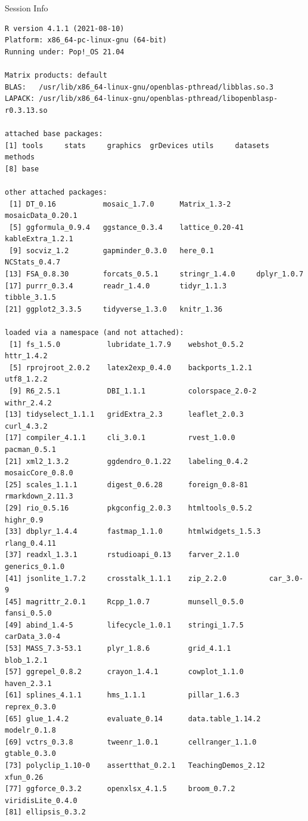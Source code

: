 \documentclass[10pt,handout]{beamer}\usepackage[]{graphicx}\usepackage[]{color}
\makeatletter
\newenvironment{kframe}{%
 \def\at@end@of@kframe{}%
 \ifinner\ifhmode%
  \def\at@end@of@kframe{\end{minipage}}%
  \begin{minipage}{\columnwidth}%
 \fi\fi%
 \def\FrameCommand##1{\hskip\@totalleftmargin \hskip-\fboxsep
 \colorbox{shadecolor}{##1}\hskip-\fboxsep
     \hskip-\linewidth \hskip-\@totalleftmargin \hskip\columnwidth}%
 \MakeFramed {\advance\hsize-\width
   \@totalleftmargin\z@ \linewidth\hsize
   \@setminipage}}%
 {\par\unskip\endMakeFramed%
 \at@end@of@kframe}
\newenvironment{knitrout}{}{} %
\makeatother
\begin{document}
\begin{frame}[fragile]{Session Info}
	\tiny
	
\begin{knitrout}\tiny
{}\color{fgcolor}\begin{kframe}
\begin{verbatim}
R version 4.1.1 (2021-08-10)
Platform: x86_64-pc-linux-gnu (64-bit)
Running under: Pop!_OS 21.04

Matrix products: default
BLAS:   /usr/lib/x86_64-linux-gnu/openblas-pthread/libblas.so.3
LAPACK: /usr/lib/x86_64-linux-gnu/openblas-pthread/libopenblasp-r0.3.13.so

attached base packages:
[1] tools     stats     graphics  grDevices utils     datasets  methods  
[8] base     

other attached packages:
 [1] DT_0.16           mosaic_1.7.0      Matrix_1.3-2      mosaicData_0.20.1
 [5] ggformula_0.9.4   ggstance_0.3.4    lattice_0.20-41   kableExtra_1.2.1 
 [9] socviz_1.2        gapminder_0.3.0   here_0.1          NCStats_0.4.7    
[13] FSA_0.8.30        forcats_0.5.1     stringr_1.4.0     dplyr_1.0.7      
[17] purrr_0.3.4       readr_1.4.0       tidyr_1.1.3       tibble_3.1.5     
[21] ggplot2_3.3.5     tidyverse_1.3.0   knitr_1.36       

loaded via a namespace (and not attached):
 [1] fs_1.5.0           lubridate_1.7.9    webshot_0.5.2      httr_1.4.2        
 [5] rprojroot_2.0.2    latex2exp_0.4.0    backports_1.2.1    utf8_1.2.2        
 [9] R6_2.5.1           DBI_1.1.1          colorspace_2.0-2   withr_2.4.2       
[13] tidyselect_1.1.1   gridExtra_2.3      leaflet_2.0.3      curl_4.3.2        
[17] compiler_4.1.1     cli_3.0.1          rvest_1.0.0        pacman_0.5.1      
[21] xml2_1.3.2         ggdendro_0.1.22    labeling_0.4.2     mosaicCore_0.8.0  
[25] scales_1.1.1       digest_0.6.28      foreign_0.8-81     rmarkdown_2.11.3  
[29] rio_0.5.16         pkgconfig_2.0.3    htmltools_0.5.2    highr_0.9         
[33] dbplyr_1.4.4       fastmap_1.1.0      htmlwidgets_1.5.3  rlang_0.4.11      
[37] readxl_1.3.1       rstudioapi_0.13    farver_2.1.0       generics_0.1.0    
[41] jsonlite_1.7.2     crosstalk_1.1.1    zip_2.2.0          car_3.0-9         
[45] magrittr_2.0.1     Rcpp_1.0.7         munsell_0.5.0      fansi_0.5.0       
[49] abind_1.4-5        lifecycle_1.0.1    stringi_1.7.5      carData_3.0-4     
[53] MASS_7.3-53.1      plyr_1.8.6         grid_4.1.1         blob_1.2.1        
[57] ggrepel_0.8.2      crayon_1.4.1       cowplot_1.1.0      haven_2.3.1       
[61] splines_4.1.1      hms_1.1.1          pillar_1.6.3       reprex_0.3.0      
[65] glue_1.4.2         evaluate_0.14      data.table_1.14.2  modelr_0.1.8      
[69] vctrs_0.3.8        tweenr_1.0.1       cellranger_1.1.0   gtable_0.3.0      
[73] polyclip_1.10-0    assertthat_0.2.1   TeachingDemos_2.12 xfun_0.26         
[77] ggforce_0.3.2      openxlsx_4.1.5     broom_0.7.2        viridisLite_0.4.0 
[81] ellipsis_0.3.2    
\end{verbatim}
\end{kframe}
\end{knitrout}
	
\end{frame}
\end{document}
